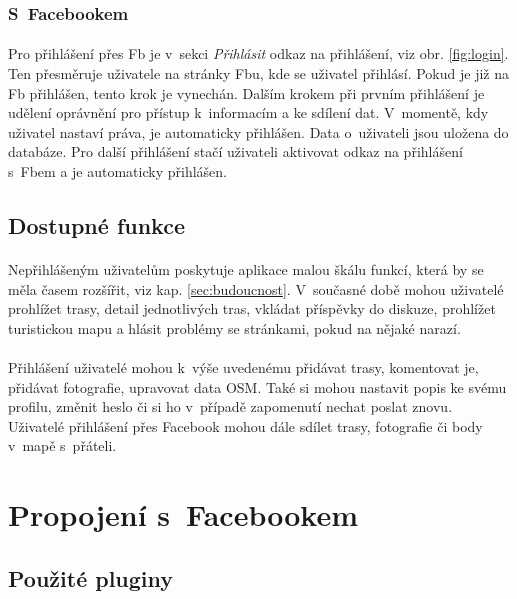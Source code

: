 \documentclass[11pt,a4paper,titlepage,oneside]{book}
\begin{document}
				\subsubsection{S~Facebookem} 
					\paragraph{}Pro přihlášení přes \ac{Fb} je v~sekci \textit{Přihlásit} odkaz na přihlášení, viz obr. \ref{fig:login}. Ten přesměruje uživatele na stránky \acl{Fb}u, kde se uživatel přihlásí. Pokud je již na \ac{Fb} přihlášen, tento krok je vynechán. Dalším krokem při prvním přihlášení je udělení oprávnění pro přístup k~informacím a ke sdílení dat. V~momentě, kdy uživatel nastaví práva, je automaticky přihlášen. Data o~uživateli jsou uložena do databáze. Pro další přihlášení stačí uživateli aktivovat odkaz na přihlášení s~\acl{Fb}em a je automaticky přihlášen.

			\subsection{Dostupné funkce}
				\label{sec:funkce}
				\paragraph{} Nepřihlášeným uživatelům poskytuje aplikace malou škálu funkcí, která by se měla časem rozšířit, viz kap. \ref{sec:budoucnost}. V~současné době mohou uživatelé prohlížet trasy, detail jednotlivých tras, vkládat příspěvky do diskuze, prohlížet turistickou mapu a hlásit problémy se stránkami, pokud na nějaké narazí.
				\paragraph{} Přihlášení uživatelé mohou k~výše uvedenému přidávat trasy, komentovat je, přidávat fotografie, upravovat data \acl{OSM}. Také si mohou nastavit popis ke svému profilu, změnit heslo či si ho v~případě zapomenutí nechat poslat znovu. Uživatelé přihlášení přes Facebook mohou dále sdílet trasy, fotografie či body v~mapě s~přáteli.

		\section{Propojení s~Facebookem}
			\subsection{Použité pluginy}
\end{document}
